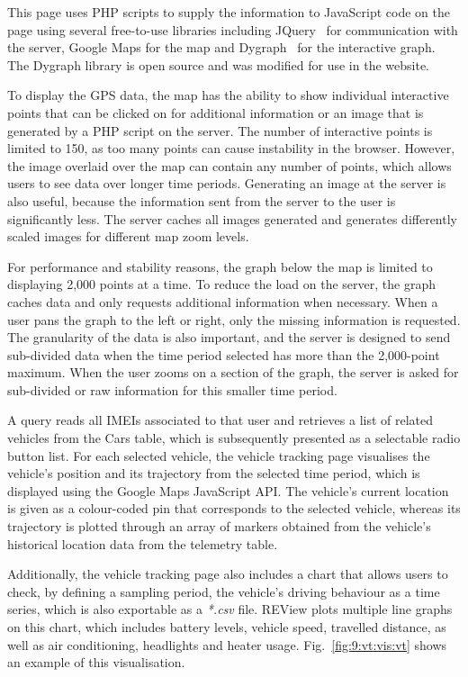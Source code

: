 This page uses PHP scripts to supply the information to JavaScript code on the page using several free-to-use libraries including JQuery~\cite{noauthor_jquery_2019} for communication with the server, Google Maps for the map and Dygraph~\cite{vanderkam_interactive_2019} for the interactive graph. The Dygraph library is open source and was modified for use in the website. 

To display the GPS data, the map has the ability to show individual interactive points that can be clicked on for additional information or an image that is generated by a PHP script on the server. The number of interactive points is limited to 150, as too many points can cause instability in the browser. However, the image overlaid over the map can contain any number of points, which allows users to see data over longer time periods. Generating an image at the server is also useful, because the information sent from the server to the user is significantly less. The server caches all images generated and generates differently scaled images for different map zoom levels.

For performance and stability reasons, the graph below the map is limited to displaying 2,000 points at a time. To reduce the load on the server, the graph caches data and only requests additional information when necessary. When a user pans the graph to the left or right, only the missing information is requested. The granularity of the data is also important, and the server is designed to send sub-divided data when the time period selected has more than the 2,000-point maximum. When the user zooms on a section of the graph, the server is asked for sub-divided or raw information for this smaller time period. 

A query reads all IMEIs associated to that user and retrieves a list of related vehicles from the Cars table, which is subsequently presented as a selectable radio button list. For each selected vehicle, the vehicle tracking page visualises the vehicle’s position and its trajectory from the selected time period, which is displayed using the Google Maps JavaScript API. The vehicle’s current location is given as a colour-coded pin that corresponds to the selected vehicle, whereas its trajectory is plotted through an array of markers obtained from the vehicle’s historical location data from the telemetry table. 

Additionally, the vehicle tracking page also includes a chart that allows users to check, by defining a sampling period, the vehicle’s driving behaviour as a time series, which is also exportable as a \textit{*.csv} file. REView plots multiple line graphs on this chart, which includes battery levels, vehicle speed, travelled distance, as well as air conditioning, headlights and heater usage. Fig.~\ref{fig:9:vt:vis:vt} shows an example of this visualisation.

